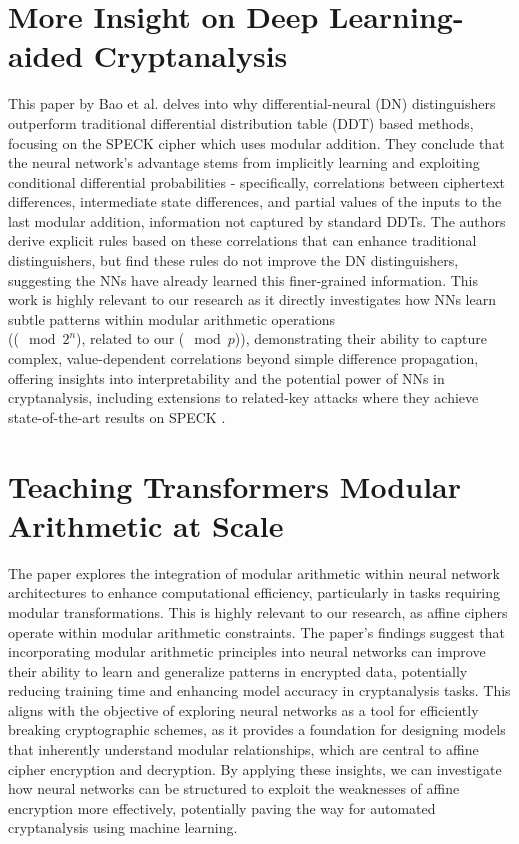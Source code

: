 \documentclass[manuscript,screen,review,acmtog,natbib=false]{acmart}
\begin{document}
    

    \section{More Insight on Deep Learning-aided Cryptanalysis}
    This paper by Bao et al. delves into why differential-neural (DN) distinguishers
    outperform traditional differential distribution table (DDT) based methods, focusing on 
    the SPECK cipher which uses modular addition. They conclude that the neural network's
    advantage stems from implicitly learning and exploiting conditional differential
    probabilities - specifically, correlations between ciphertext differences, intermediate
    state differences, and partial values of the inputs to the last modular addition,
    information not captured by standard DDTs. The authors derive explicit rules based on
    these correlations that can enhance traditional distinguishers, but find these rules do not
    improve the DN distinguishers, suggesting the NNs have already learned this finer-grained information.
    This work is highly relevant to our research as it directly investigates how NNs learn subtle patterns
    within modular arithmetic operations\\(($\!\!\! \mod 2^n$), related to our ($\!\!\! \mod p$)), demonstrating their
    ability to capture complex, value-dependent correlations beyond simple difference propagation,
    offering insights into interpretability and the potential power of NNs in cryptanalysis, including extensions
    to related-key attacks where they achieve state-of-the-art results on SPECK \cite{cryptoeprint:2023/1391}.

    \section{Teaching Transformers Modular Arithmetic at Scale}
    The paper explores the integration of modular arithmetic within neural
    network architectures to enhance computational efficiency, particularly in 
    tasks requiring modular transformations. This is highly relevant to our research, as affine
    ciphers operate within modular arithmetic constraints. The paper's findings suggest that
    incorporating modular arithmetic principles into neural networks can improve their ability
    to learn and generalize patterns in encrypted data, potentially reducing training time and enhancing model
    accuracy in cryptanalysis tasks. This aligns with the objective of exploring neural networks as a tool
    for efficiently breaking cryptographic schemes, as it provides a foundation for designing models that
    inherently understand modular relationships, which are central to affine cipher encryption and decryption.
    By applying these insights, we can investigate how neural networks can be
    structured to exploit the weaknesses of affine encryption more effectively, potentially paving the way
    for automated cryptanalysis using machine learning.

    \printbibliography
\end{document}
